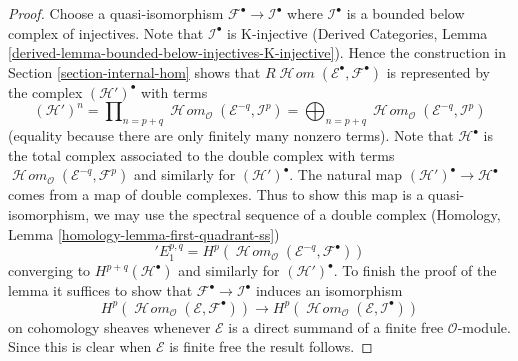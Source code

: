 \documentclass[10pt,a4paper]{amsart}
\theoremstyle{plain}
\theoremstyle{definition}
\theoremstyle{remark}
\numberwithin{equation}{subsection}
\def\SheafHom{\mathop{\mathcal{H}\!\mathit{om}}\nolimits}
\begin{document}
\begin{proof}
Choose a quasi-isomorphism $\mathcal{F}^\bullet \to \mathcal{I}^\bullet$
where $\mathcal{I}^\bullet$ is a bounded below complex of injectives.
Note that $\mathcal{I}^\bullet$ is K-injective
(Derived Categories, Lemma
\ref{derived-lemma-bounded-below-injectives-K-injective}).
Hence the construction in Section \ref{section-internal-hom}
shows that
$R\SheafHom(\mathcal{E}^\bullet, \mathcal{F}^\bullet)$ is 
represented by the complex $(\mathcal{H}')^\bullet$ with terms
$$
(\mathcal{H}')^n =
\prod\nolimits_{n = p + q}
\SheafHom_\mathcal{O}(\mathcal{E}^{-q}, \mathcal{I}^p) =
\bigoplus\nolimits_{n = p + q}
\SheafHom_\mathcal{O}(\mathcal{E}^{-q}, \mathcal{I}^p)
$$
(equality because there are only finitely many nonzero terms).
Note that $\mathcal{H}^\bullet$ is the total complex associated to
the double complex with terms
$\SheafHom_\mathcal{O}(\mathcal{E}^{-q}, \mathcal{F}^p)$
and similarly for $(\mathcal{H}')^\bullet$.
The natural map $(\mathcal{H}')^\bullet \to \mathcal{H}^\bullet$
comes from a map of double complexes.
Thus to show this map is a quasi-isomorphism, we may use the spectral
sequence of a double complex
(Homology, Lemma \ref{homology-lemma-first-quadrant-ss})
$$
{}'E_1^{p, q} =
H^p(\SheafHom_\mathcal{O}(\mathcal{E}^{-q}, \mathcal{F}^\bullet))
$$
converging to $H^{p + q}(\mathcal{H}^\bullet)$ and similarly for
$(\mathcal{H}')^\bullet$. To finish the proof of the lemma it
suffices to show that $\mathcal{F}^\bullet \to \mathcal{I}^\bullet$
induces an isomorphism
$$
H^p(\SheafHom_\mathcal{O}(\mathcal{E}, \mathcal{F}^\bullet))
\longrightarrow
H^p(\SheafHom_\mathcal{O}(\mathcal{E}, \mathcal{I}^\bullet))
$$
on cohomology sheaves whenever $\mathcal{E}$ is a direct summand of a
finite free $\mathcal{O}$-module. Since this is clear when $\mathcal{E}$
is finite free the result follows.
\end{proof}
\end{document}
